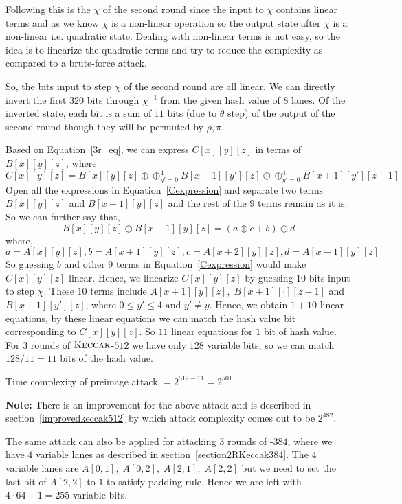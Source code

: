   Following this is the $\chi$ of the second round since the input to $\chi$ contains linear terms and as we know $\chi$ is a non-linear operation so the output state after $\chi$ is a non-linear i.e. quadratic state. Dealing with non-linear terms is not easy, so the idea is to linearize the quadratic terms and try to reduce the complexity as compared to a brute-force attack.

  So, the bits input to step $\chi$ of the second round are all linear. We can directly invert the first 320 bits through $\chi^{-1}$ from the given hash value of $8$ lanes. Of the inverted state, each bit is a sum of $11$ bits (due to $\theta$ step) of the output of the second round though they will be permuted by $\rho, \pi$.

  Based on Equation~\ref{3r_eq}, we can express $C[x][y][z]$ in terms of $B[x][y][z]$, where  
\begin{equation}\label{Cexpression}
 C[x][y][z] = B[x][y][z] \oplus \oplus_{y' = 0}^{4} B[x-1][y'][z] \oplus \oplus_{y' = 0}^{4} B[x+1][y'][z-1]
\end{equation}
  Open all the expressions in Equation~\ref{Cexpression} and separate two terms $B[x][y][z]$ and $B[x-1][y][z]$ and the rest of the $9$ terms remain as it is.
    So we can further say that, 
        \[ B[x][y][z] \oplus B[x-1][y][z] = (a \oplus c + b) \oplus d
    \]
    where,
         \[
        a = A[x][y][z], b = A[x + 1][y][z], c = A[x + 2][y][z], d = A[x - 1][y][z]
    \]
    So guessing $b$ and other $9$ terms in Equation~\ref{Cexpression} would make $C[x][y][z]$ linear. Hence, we linearize $C[x][y][z]$ by guessing $10$ bits input to step $\chi$. These $10$ terms include $A[x + 1][y][z],\;B[x + 1][\cdot][z-1]$ and $B[x-1][y'][z]$, where $0 \leq y' \leq 4 \text{ and } y' \neq y$. Hence, we obtain $1 + 10$ linear equations, by these linear equations we can match the hash value bit corresponding to $C[x][y][z]$. So $11$ linear equations for $1$ bit of hash value. For $3$ rounds of $\mbox{\textsc{Keccak}}$-$512$ we have only $128$ variable bits, so we can match $128/11 = 11$ bits of the hash value.
    
    Time complexity of preimage attack $= 2^{512 - 11} = 2^{501}$.

    \textbf{Note:} There is an improvement for the above attack and is described in section~\ref{improvedkeccak512} by which attack complexity comes out to be $2^{482}$.

	The same attack can also be applied for attacking $3$ rounds of \KECCAK-$384$, where we have $4$ variable lanes as described in section~\ref{section2RKeccak384}. The $4$ variable lanes are $A[0,1],\; A[0,2],\; A[2,1],\; A[2,2]$ but we need to set the last bit of $A[2,2]$ to $1$ to satisfy padding rule. Hence we are left with $4 \cdot 64 - 1 = 255$ variable bits.
    
